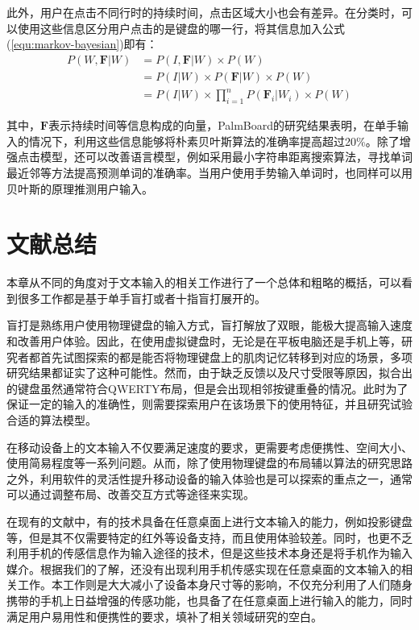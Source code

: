 此外，用户在点击不同行时的持续时间，点击区域大小也会有差异。在分类时，可以使用这些信息区分用户点击的是键盘的哪一行，将其信息加入公式(\ref{equ:markov-bayesian})即有：
\begin{equation}
    \begin{aligned}
        P(W, \textbf{F}|W) &= P(I,\textbf{F}|W) \times P(W) \\ 
        &= P(I|W) \times P(\textbf{F}|W) \times P(W) \\ &= P(I|W) \times \prod_{i=1}^{n}P(\textbf{F}_{i}|W_{i}) \times P(W)
    \end{aligned} 
\end{equation}

其中，$\textbf{F}$表示持续时间等信息构成的向量，PalmBoard\cite{palmboard2020}的研究结果表明，在单手输入的情况下，利用这些信息能够将朴素贝叶斯算法的准确率提高超过20\%。除了增强点击模型，还可以改善语言模型，例如采用最小字符串距离搜索算法\cite{tinwala2010eyes}，寻找单词最近邻\cite{bunke1993fast}等方法提高预测单词的准确率。当用户使用手势输入单词时，也同样可以用贝叶斯的原理推测用户输入\cite{zhai2012word}。

\section{文献总结}
本章从不同的角度对于文本输入的相关工作进行了一个总体和粗略的概括，可以看到很多工作都是基于单手盲打或者十指盲打展开的。

盲打是熟练用户使用物理键盘的输入方式，盲打解放了双眼，能极大提高输入速度和改善用户体验。因此，在使用虚拟键盘时，无论是在平板电脑还是手机上等，研究者都首先试图探索的都是能否将物理键盘上的肌肉记忆转移到对应的场景，多项研究结果都证实了这种可能性\cite{2017blindtype}\cite{2018shitoast}\cite{zhu2018typing}\cite{palmboard2020}。然而，由于缺乏反馈以及尺寸受限等原因，拟合出的键盘虽然通常符合QWERTY布局，但是会出现相邻按键重叠的情况。此时为了保证一定的输入的准确性，则需要探索用户在该场景下的使用特征，并且研究试验合适的算法模型。

在移动设备上的文本输入不仅要满足速度的要求，更需要考虑便携性、空间大小、使用简易程度等一系列问题。从而，除了使用物理键盘的布局辅以算法的研究思路之外，利用软件的灵活性提升移动设备的输入体验也是可以探索的重点之一，通常可以通过调整布局、改善交互方式等途径来实现。

在现有的文献中，有的技术具备在任意桌面上进行文本输入的能力，例如投影键盘等，但是其不仅需要特定的红外等设备支持，而且使用体验较差。同时，也更不乏利用手机的传感信息作为输入途径的技术，但是这些技术本身还是将手机作为输入媒介。根据我们的了解，还没有出现利用手机传感实现在任意桌面的文本输入的相关工作。本工作则是大大减小了设备本身尺寸等的影响，不仅充分利用了人们随身携带的手机上日益增强的传感功能，也具备了在任意桌面上进行输入的能力，同时满足用户易用性和便携性的要求，填补了相关领域研究的空白。